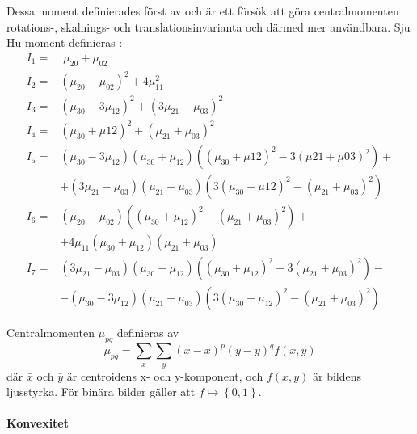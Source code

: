 \documentclass[../rapport_MVEX01-11-05]{subfiles}
\begin{document}
Dessa moment definierades först av  och är ett försök att
göra centralmomenten rotations-, skalnings- och translationsinvarianta och
därmed mer användbara. Sju Hu-moment definieras \cite[s.~185]{Hu62}:
\begin{align*}
	I_1 =& \;\mu_{20} + \mu_{02}\\
	I_2 =& \left(\mu_{20} - \mu_{02}\right)^2 + 4\mu^2_{11}\\
	I_3 =& \left(\mu_{30} - 3\mu_{12}\right)^2 +
	       \left(3\mu_{21} - \mu_{03}\right)^2\\
	I_4 =& \left(\mu_{30} + \mu{12}\right)^2 +
 	       \left(\mu_{21} + \mu_{03}\right)^2\\
	I_5 =& \left(\mu_{30} - 3\mu_{12}\right)
	       \left(\mu_{30} + \mu_{12}\right)
	       \left(\left(\mu_{30}+\mu{12}\right)^2 -
	       3\left(\mu{21}+\mu{03}\right)^2\right) + \\
 	    &+ \left(3\mu_{21} - \mu_{03}\right)\left(\mu_{21} + \mu_{03}\right)
	       \left(3\left(\mu_{30} + \mu{12}\right)^2 -
	       \left(\mu_{21} + \mu_{03}\right)^2\right)\\
	I_6 =& \left(\mu_{20}-\mu_{02}\right)
	       \left(\left(\mu_{30}+\mu_{12}\right)^2 -
	       \left(\mu_{21}+\mu_{03}\right)^2\right) + \\
	    &+ 4\mu_{11}\left(\mu_{30}+\mu_{12}\right)
	       \left(\mu_{21}+\mu_{03}\right)\\
	I_7 =& \left(3\mu_{21}-\mu_{03}\right)\left(\mu_{30}-\mu_{12}\right)
	       \left(\left(\mu_{30}+\mu_{12}\right)^2 - 
	       3\left(\mu_{21}+\mu_{03}\right)^2\right) - \\
	    &- \left(\mu_{30} - 3\mu_{12}\right)\left(\mu_{21}+\mu_{03}\right)
	       \left(3\left(\mu_{30}+\mu_{12}\right)^2 - 
  	     \left(\mu_{21}+\mu_{03}\right)^2\right)
\end{align*}

Centralmomenten $\mu_{pq}$ definieras av
\begin{equation*}
	\mu_{pq} = \sum\limits_x\sum\limits_y
	           \left(x-\bar{x}\right)^p
	           \left(y-\bar{y}\right)^q
	           f(x,y)
\end{equation*}
där $\bar{x}$ och $\bar{y}$ är centroidens x- och y-komponent, och $f(x,y)$ är
bildens ljusstyrka. För binära bilder gäller att $f\mapsto\left\{0,1\right\}$.

\paragraph{Konvexitet}
\end{document}
